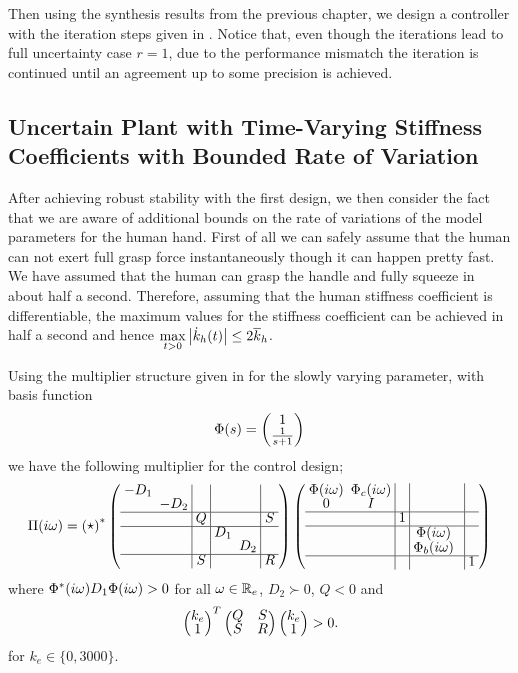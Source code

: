 \let\designdataone\empty


Then using the synthesis results from the previous chapter, we design a controller with the iteration steps given in 
. Notice that, even though the iterations lead to full uncertainty case $r=1$, due to the performance 
mismatch the iteration is continued until an agreement up to some precision is achieved. 

\subsection{Uncertain Plant with Time-Varying Stiffness Coefficients with Bounded Rate of Variation}

After achieving robust stability with the first design, we then consider the fact that we are aware of additional bounds on 
the rate of variations of the model parameters for the human hand. First of all we can safely assume that the human can not 
exert full grasp force instantaneously though it can happen pretty fast. We have assumed that the human can grasp the handle 
and fully squeeze in about half a second. Therefore, assuming that the human stiffness coefficient is differentiable, the 
maximum values for the stiffness coefficient can be achieved in half a second and hence ${\displaystyle\max_{t>0}}\displaystyle \left|\dot{k}_h(t)\right|\leq 
2\overline{k}_h$. 

Using the multiplier structure given in  for the slowly varying parameter, with basis function 
\[
\Phi(s) = \pmatr{1\\\frac{1}{s+1}}
\]
we have the following multiplier for the control design;
\[\renewcommand*{\arraystretch}{0.8}
\setlength{\arraycolsep}{.5\arraycolsep}
\Pi(\iw) = \pmatr{\star}^*\left(
\begin{array}{cc|c|cc|c}
	-D_1 & & &&&\\
    &-D_2&&&&\\\hline
    &&Q&&&S\\\hline
    &&&D_1&&\\
    &&&&D_2&\\\hline
    &&S&&&R
\end{array}
\right)
\left(\begin{array}{cc|c|cc|c}
	\Phi(\iw) &\Phi_c(\iw)&&&\\
    0&I&&&&\\\hline
    &&1&&&\\\hline
    &&&\Phi(\iw)&&\\
    &&&\Phi_b(\iw)&&\\\hline
    &&&&&1
    \end{array}
    \right)
\]
where $\Phi^*(i\omega)D_1\Phi(i\omega)> 0$ for all $\omega\in\mathbb{R}_e$, $D_2\succ 0$, $Q<0$ and 
\[
\pmatr{k_e\\1}^T\pmatr{Q &S\\S&R}\pmatr{k_e\\1}>0.
\] 
for $k_e\in\{0,3000\}$. 



